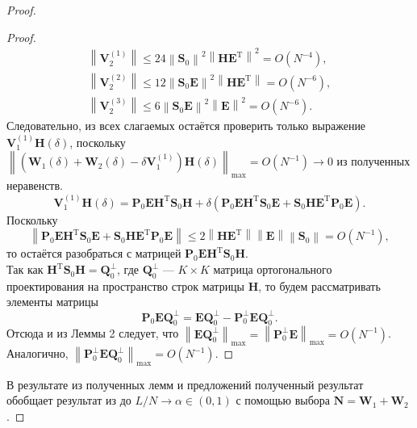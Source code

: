 \documentclass[specialist,
               substylefile = spbu_report.rtx,
               subf,href,colorlinks=true, 12pt]{disser}
\newcommand\norm[1]{\left\|#1\right\|}
\begin{document}
\begin{proof}
\begin{proof}
\begin{align*}
		\norm{\mathbf{V}_2^{(1)}}\leqslant 24\norm{\mathbf{S}_0}^2\norm{\mathbf{HE}^\mathrm{T}}^2=O(N^{-4}),\\
		\norm{\mathbf{V}_2^{(2)}}\leqslant 12\norm{\mathbf{S}_0\mathbf{E}}^2\norm{\mathbf{HE}^\mathrm{T}}=O(N^{-6}),\\
		\norm{\mathbf{V}_2^{(3)}}\leqslant 6\norm{\mathbf{S}_0\mathbf{E}}^2\norm{\mathbf{E}}^2=O(N^{-6}).
	\end{align*}
	Следовательно, из всех слагаемых остаётся проверить только выражение $\mathbf{V}_1^{(1)}\mathbf{H}(\delta)$, поскольку $\norm{(\mathbf{W}_1(\delta)+\mathbf{W}_2(\delta)-\delta\mathbf{V}_1^{(1)})\mathbf{H}(\delta)}_{\max}=O(N^{-1})\rightarrow 0$ из полученных неравенств. 
	\begin{equation*}
		\mathbf{V}_1^{(1)}\mathbf{H}(\delta) = \mathbf{P}_0\mathbf{EH}^\mathrm{T}\mathbf{S}_0\mathbf{H}+\delta(\mathbf{P}_0\mathbf{EH}^\mathrm{T}\mathbf{S}_0\mathbf{E}+\mathbf{S}_0\mathbf{HE}^\mathrm{T}\mathbf{P}_0\mathbf{E}).
	\end{equation*}
	Поскольку
	\begin{equation*}
		\norm{\mathbf{P}_0\mathbf{EH}^\mathrm{T}\mathbf{S}_0\mathbf{E}+\mathbf{S}_0\mathbf{HE}^\mathrm{T}\mathbf{P}_0\mathbf{E}}\leqslant 2\norm{\mathbf{HE}^\mathrm{T}}\norm{\mathbf{E}}\norm{\mathbf{S}_0}=O(N^{-1}),
	\end{equation*}
	то остаётся разобраться с матрицей $\mathbf{P}_0\mathbf{EH}^\mathrm{T}\mathbf{S}_0\mathbf{H}$.\\
	Так как $\mathbf{H}^\mathrm{T}\mathbf{S}_0\mathbf{H}=\mathbf{Q}_0^\bot$, где $\mathbf{Q}_0^\bot$ --- $K\times K$ матрица ортогонального проектирования на пространство строк матрицы $\mathbf{H}$, то будем рассматривать элементы матрицы
	\begin{equation*}
		\mathbf{P}_0\mathbf{EQ}_0^\bot = \mathbf{E}\mathbf{Q}_0^\bot - \mathbf{P}_0^\bot\mathbf{E}\mathbf{Q}_0^\bot.
	\end{equation*}
	 Отсюда и из Леммы 2 \cite{ZNekrutkin} следует, что $\norm{\mathbf{E}\mathbf{Q}_0^\bot}_{\max}=\norm{\mathbf{P}_0^\bot\mathbf{E}}_{\max}=O(N^{-1})$. Аналогично, $\norm{\mathbf{P}_0^\bot\mathbf{E}\mathbf{Q}_0^\bot}_{\max}=O(N^{-1})$.
\end{proof}
В результате из полученных лемм и предложений полученный результат обобщает результат из \cite{ZNekrutkin} до $L/N\rightarrow \alpha\in(0, 1)$ с помощью выбора $\mathbf{N} = \mathbf{W}_1 + \mathbf{W}_2$.
\end{proof} 
\end{document}
